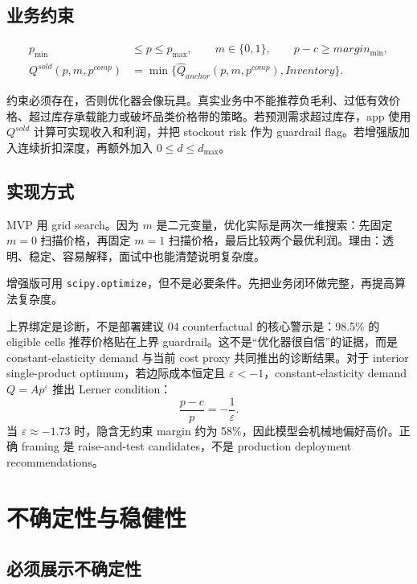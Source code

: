 \documentclass[UTF8,11pt,a4paper,fontset=none]{ctexart}
\begin{document}
\subsection{业务约束}

\begin{align}
p_{\min} &\le p \le p_{\max},\qquad
m\in\{0,1\},\qquad
p-c \ge margin_{\min},\\
Q^{sold}(p,m,p^{comp})
&= \min\{\widehat{Q}_{anchor}(p,m,p^{comp}),Inventory\}.
\end{align}

约束必须存在，否则优化器会像玩具。真实业务中不能推荐负毛利、过低有效价格、超过库存承载能力或破坏品类价格带的策略。若预测需求超过库存，app 使用 $Q^{sold}$ 计算可实现收入和利润，并把 stockout risk 作为 guardrail flag。若增强版加入连续折扣深度，再额外加入 $0 \le d \le d_{\max}$。

\subsection{实现方式}

MVP 用 grid search。因为 $m$ 是二元变量，优化实际是两次一维搜索：先固定 $m=0$ 扫描价格，再固定 $m=1$ 扫描价格，最后比较两个最优利润。理由：透明、稳定、容易解释，面试中也能清楚说明复杂度。

增强版可用 \texttt{scipy.optimize}，但不是必要条件。先把业务闭环做完整，再提高算法复杂度。

\begin{decisionbox}{上界绑定是诊断，不是部署建议}
04 counterfactual 的核心警示是：98.5\% 的 eligible cells 推荐价格贴在上界 guardrail。这不是“优化器很自信”的证据，而是 constant-elasticity demand 与当前 cost proxy 共同推出的诊断结果。对于 interior single-product optimum，若边际成本恒定且 $\varepsilon<-1$，constant-elasticity demand $Q=A p^\varepsilon$ 推出 Lerner condition：
\[
\frac{p-c}{p}=-\frac{1}{\varepsilon}.
\]
当 $\varepsilon\approx -1.73$ 时，隐含无约束 margin 约为 58\%，因此模型会机械地偏好高价。正确 framing 是 raise-and-test candidates，不是 production deployment recommendations。
\end{decisionbox}

\section{不确定性与稳健性}

\subsection{必须展示不确定性}
\end{document}
